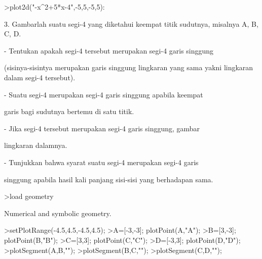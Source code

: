 \documentclass[a4paper,10pt]{article}
\begin{document}
\begin{eulernotebook}
\begin{eulercomment}
\begin{eulercomment}
\begin{euleroutput}
\end{euleroutput}
\begin{eulerprompt}
>plot2d("-x^2+5*x-4",-5,5,-5,5):
\end{eulerprompt}
\begin{eulercomment}
3. Gambarlah suatu segi-4 yang diketahui keempat titik sudutnya,
misalnya A, B, C, D.\\
\end{eulercomment}
\begin{eulerttcomment}
   - Tentukan apakah segi-4 tersebut merupakan segi-4 garis singgung
\end{eulerttcomment}
\begin{eulercomment}
(sisinya-sisintya merupakan garis singgung lingkaran yang sama yakni
lingkaran dalam segi-4 tersebut).\\
\end{eulercomment}
\begin{eulerttcomment}
   - Suatu segi-4 merupakan segi-4 garis singgung apabila keempat
\end{eulerttcomment}
\begin{eulercomment}
garis bagi sudutnya bertemu di satu titik.\\
\end{eulercomment}
\begin{eulerttcomment}
   - Jika segi-4 tersebut merupakan segi-4 garis singgung, gambar
\end{eulerttcomment}
\begin{eulercomment}
lingkaran dalamnya.\\
\end{eulercomment}
\begin{eulerttcomment}
   - Tunjukkan bahwa syarat suatu segi-4 merupakan segi-4 garis
\end{eulerttcomment}
\begin{eulercomment}
singgung apabila hasil kali panjang sisi-sisi yang berhadapan sama.
\end{eulercomment}
\begin{eulerprompt}
>load geometry
\end{eulerprompt}
\begin{euleroutput}
  Numerical and symbolic geometry.
\end{euleroutput}
\begin{eulerprompt}
>setPlotRange(-4.5,4.5,-4.5,4.5);
>A=[-3,-3]; plotPoint(A,"A");
>B=[3,-3]; plotPoint(B,"B");
>C=[3,3]; plotPoint(C,"C");
>D=[-3,3]; plotPoint(D,"D");
>plotSegment(A,B,"");
>plotSegment(B,C,"");
>plotSegment(C,D,"");

\end{eulerprompt}
\end{eulercomment}
\end{eulercomment}
\end{eulernotebook}
\end{document}
